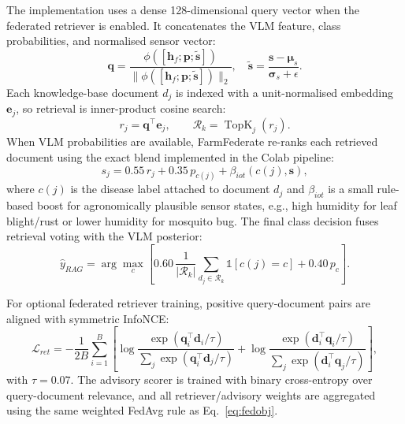 \documentclass[12pt, a4paper, oneside]{Thesis}
\begin{document}
The implementation uses a dense 128-dimensional query vector when the federated
retriever is enabled. It concatenates the VLM feature, class probabilities, and
normalised sensor vector:
\begin{equation}
  \mathbf{q} =
  \frac{\phi([\mathbf{h}_f;\mathbf{p};\tilde{\mathbf{s}}])}
       {\|\phi([\mathbf{h}_f;\mathbf{p};\tilde{\mathbf{s}}])\|_2},
  \quad
  \tilde{\mathbf{s}}=\frac{\mathbf{s}-\boldsymbol{\mu}_s}{\boldsymbol{\sigma}_s+\epsilon}.
  \label{eq:ragquery}
\end{equation}
Each knowledge-base document $d_j$ is indexed with a unit-normalised embedding
$\mathbf{e}_j$, so retrieval is inner-product cosine search:
\begin{equation}
  r_j = \mathbf{q}^{\top}\mathbf{e}_j,\qquad
  \mathcal{R}_k=\operatorname{TopK}_{j}(r_j).
  \label{eq:retrieval}
\end{equation}
When VLM probabilities are available, FarmFederate re-ranks each retrieved
document using the exact blend implemented in the Colab pipeline:
\begin{equation}
  s_j = 0.55\,r_j + 0.35\,p_{c(j)} + \beta_{iot}(c(j),\mathbf{s}),
  \label{eq:rerank}
\end{equation}
where $c(j)$ is the disease label attached to document $d_j$ and $\beta_{iot}$ is a
small rule-based boost for agronomically plausible sensor states, e.g., high
humidity for leaf blight/rust or lower humidity for mosquito bug. The final class
decision fuses retrieval voting with the VLM posterior:
\begin{equation}
  \hat{y}_{RAG} =
  \arg\max_c\left[
    0.60\,\frac{1}{|\mathcal{R}_k|}\sum_{d_j\in\mathcal{R}_k}\mathbb{1}[c(j)=c]
    +0.40\,p_c
  \right].
  \label{eq:ragvote}
\end{equation}

For optional federated retriever training, positive query-document pairs are
aligned with symmetric InfoNCE:
\begin{equation}
  \mathcal{L}_{ret} =
  -\frac{1}{2B}\sum_{i=1}^{B}
  \left[
    \log\frac{\exp(\mathbf{q}_i^\top\mathbf{d}_i/\tau)}
              {\sum_j\exp(\mathbf{q}_i^\top\mathbf{d}_j/\tau)}
    +
    \log\frac{\exp(\mathbf{d}_i^\top\mathbf{q}_i/\tau)}
              {\sum_j\exp(\mathbf{d}_i^\top\mathbf{q}_j/\tau)}
  \right],
  \label{eq:infonce}
\end{equation}
with $\tau=0.07$. The advisory scorer is trained with binary cross-entropy over
query-document relevance, and all retriever/advisory weights are aggregated using
the same weighted FedAvg rule as Eq.~\ref{eq:fedobj}.
\end{document}
